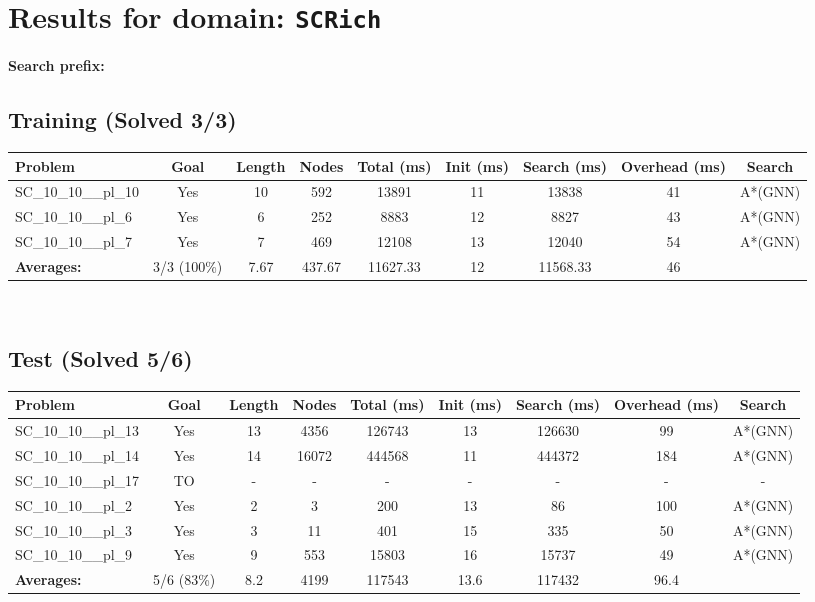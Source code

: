 \documentclass{article}
\begin{document}
\section*{Results for domain: \texttt{SCRich}}
\textbf{Search prefix:} 
\\[0.5cm]
\subsection*{Training (Solved 3/3)}
\begin{tabular}{lcccccccc}
\toprule
Problem & Goal & Length & Nodes & Total (ms) & Init (ms) & Search (ms) & Overhead (ms) & Search \\
\midrule
SC\_10\_10\_\_pl\_10 & Yes & 10 & 592 & 13891 & 11 & 13838 & 41 & A*(GNN) \\
SC\_10\_10\_\_pl\_6 & Yes & 6 & 252 & 8883 & 12 & 8827 & 43 & A*(GNN) \\
SC\_10\_10\_\_pl\_7 & Yes & 7 & 469 & 12108 & 13 & 12040 & 54 & A*(GNN) \\
\textbf{Averages:} & 3/3 (100\%) & 7.67 & 437.67 & 11627.33 & 12 & 11568.33 & 46 & \\
\bottomrule
\end{tabular}
\\[0.7cm]
\subsection*{Test (Solved 5/6)}
\begin{tabular}{lcccccccc}
\toprule
Problem & Goal & Length & Nodes & Total (ms) & Init (ms) & Search (ms) & Overhead (ms) & Search \\
\midrule
SC\_10\_10\_\_pl\_13 & Yes & 13 & 4356 & 126743 & 13 & 126630 & 99 & A*(GNN) \\
SC\_10\_10\_\_pl\_14 & Yes & 14 & 16072 & 444568 & 11 & 444372 & 184 & A*(GNN) \\
SC\_10\_10\_\_pl\_17 & TO & - & - & - & - & - & - & - \\
SC\_10\_10\_\_pl\_2 & Yes & 2 & 3 & 200 & 13 & 86 & 100 & A*(GNN) \\
SC\_10\_10\_\_pl\_3 & Yes & 3 & 11 & 401 & 15 & 335 & 50 & A*(GNN) \\
SC\_10\_10\_\_pl\_9 & Yes & 9 & 553 & 15803 & 16 & 15737 & 49 & A*(GNN) \\
\textbf{Averages:} & 5/6 (83\%) & 8.2 & 4199 & 117543 & 13.6 & 117432 & 96.4 & \\
\bottomrule
\end{tabular}
\\[0.7cm]
\end{document}
